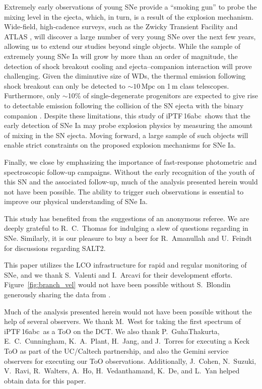\documentclass[twocolumn]{aastex61}
\newcommand{\abc}{iPTF\,16abc}
\begin{document}
Extremely early observations of young SNe provide a ``smoking gun'' to probe
the mixing level in the ejecta, which, in turn, is a result of the explosion
mechanism. Wide-field, high-cadence surveys, such as the Zwicky Transient
Facility \citep{2016PASP..128h4501B} and ATLAS
\citep{2011PASP..123...58T,2013RSPTA.37120269T}, will discover a large
number of very young SNe over the next few years, allowing us to extend our
studies beyond single objects. While the sample of extremely young SNe Ia
will grow by more than an order of magnitude, the detection of shock
breakout cooling and ejecta--companion interaction will prove challenging.
Given the diminutive size of WDs, the thermal emission following shock
breakout can only be detected to $\sim 10\,\mathrm{Mpc}$ on 1\,m class
telescopes. Furthermore, only $\sim$10\% of single-degenerate progenitors
are expected to give rise to detectable emission following the collision of
the SN ejecta with the binary companion \citep{2010ApJ...708.1025K}. Despite
these limitations, this study of \abc\ shows that the early detection of SNe
Ia may probe explosion physics by measuring the amount of mixing in the SN
ejecta. Moving forward, a large sample of such objects will enable strict
constraints on the proposed explosion mechanisms for SNe Ia.

Finally, we close by emphasizing the importance of fast-response photometric
and spectroscopic follow-up campaigns. Without the early recognition of the
youth of this SN and the associated follow-up, much of the analysis
presented herein would not have been possible. The ability to trigger such
observations is essential to improve our physical understanding of SNe Ia.

\acknowledgements

This study has benefited from the suggestions of an anonymous
referee. We are deeply grateful to R.~C.~Thomas for indulging a slew of
questions regarding  in SNe. Similarly, it is our pleasure to buy a
beer for R.~Amanullah and U.~Feindt for discussions regarding SALT2.

This paper utilizes the LCO infrastructure for rapid and regular monitoring
of SNe, and we thank S.~Valenti and I.~Arcavi for their development efforts.
Figure~\ref{fig:branch_vel} would not have been possible without S.~Blondin
generously sharing the data from \citet{2012AJ....143..126B}.

Much of the analysis presented herein would not have been possible without
the help of several observers. We thank M.~West for taking the first
spectrum of \abc\ as a ToO on the DCT. We also thank P.~GuhaThakurta,
E.~C.~Cunningham, K.~A.~Plant, H.~Jang, and J.~Torres for executing a Keck
ToO as part of the UC/Caltech partnership, and also the Gemini service
observers for executing our ToO observations. Additionally, J.~Cohen,
N.~Suzuki, V.~Ravi, R.~Walters, A.~Ho, H.~Vedanthamand, K.~De, and L.~Yan
helped obtain data for this paper.
\end{document}
